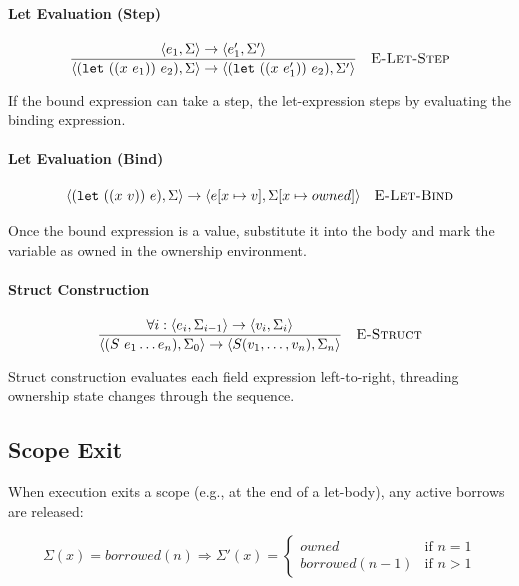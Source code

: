 \documentclass[11pt,a4paper,twoside]{book}
\begin{document}
\paragraph{Let Evaluation (Step)}

\[
\frac{
  \langle e_1, \Sigma \rangle \rightarrow \langle e_1', \Sigma' \rangle
}{
  \langle (\mathtt{let}\ ((x\ e_1))\ e_2), \Sigma \rangle
  \rightarrow
  \langle (\mathtt{let}\ ((x\ e_1'))\ e_2), \Sigma' \rangle
}
\quad \textsc{E-Let-Step}
\]

If the bound expression can take a step, the let-expression steps by evaluating
the binding expression.

\paragraph{Let Evaluation (Bind)}

\[
\langle (\mathtt{let}\ ((x\ v))\ e), \Sigma \rangle
\rightarrow
\langle e[x \mapsto v], \Sigma[x \mapsto owned] \rangle
\quad \textsc{E-Let-Bind}
\]

Once the bound expression is a value, substitute it into the body and mark the
variable as owned in the ownership environment.

\paragraph{Struct Construction}

\[
\frac{
  \forall i : \langle e_i, \Sigma_{i-1} \rangle \rightarrow \langle v_i, \Sigma_i \rangle
}{
  \langle (S\ e_1 \dots e_n), \Sigma_0 \rangle
  \rightarrow
  \langle S(v_1,\dots,v_n), \Sigma_n \rangle
}
\quad \textsc{E-Struct}
\]

Struct construction evaluates each field expression left-to-right, threading
ownership state changes through the sequence.


\subsection{Scope Exit}

When execution exits a scope (e.g., at the end of a let-body), any active borrows
are released:

\[
\Sigma(x) = borrowed(n) \Rightarrow
\Sigma'(x) =
\begin{cases}
owned & \text{if } n = 1 \\
borrowed(n-1) & \text{if } n > 1
\end{cases}
\]
\end{document}
